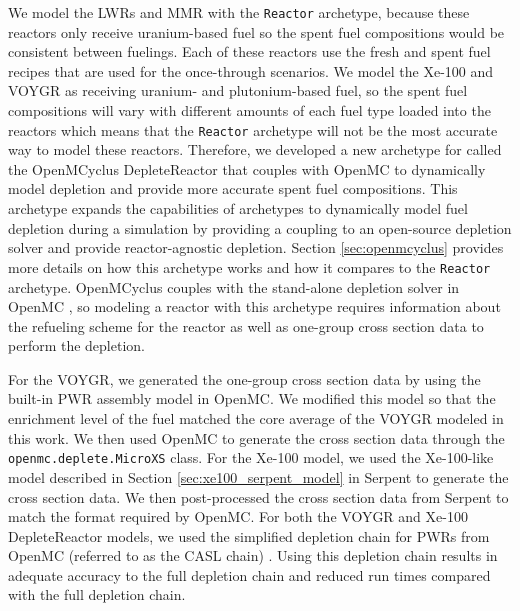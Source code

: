 

We model the \glspl{LWR} and \gls{MMR} 
with the 
\Cycamore \texttt{Reactor} archetype, because these reactors 
only receive uranium-based fuel so the spent fuel compositions 
would be consistent between fuelings. Each of these reactors use the 
fresh and spent fuel recipes that are used for the once-through scenarios.
We model the Xe-100 and VOYGR as receiving uranium- and plutonium-based 
fuel, so the spent fuel compositions will vary with different amounts 
of each fuel type loaded into the reactors which means that the 
\Cycamore \texttt{Reactor} archetype will not be the most accurate 
way to model these reactors. Therefore, we developed a new 
archetype for \Cyclus called the OpenMCyclus DepleteReactor that 
couples \Cyclus with OpenMC \cite{romano_openmc:_2015} to 
dynamically model depletion and 
provide more accurate spent fuel compositions.  
This archetype expands the capabilities of \Cyclus archetypes 
to dynamically model fuel depletion during a simulation by providing 
a coupling to an open-source depletion solver and provide
reactor-agnostic depletion. Section 
\ref{sec:openmcyclus} provides more details on how this archetype 
works and how it compares to the \Cycamore \texttt{Reactor} 
archetype. OpenMCyclus couples with the stand-alone depletion 
solver in OpenMC \cite{romano_depletion_2021}, so modeling a 
reactor with this archetype requires information about the refueling 
scheme for the reactor as well as one-group cross section data to 
perform the depletion. 

For the VOYGR, we generated the one-group cross section data by using the 
built-in \gls{PWR} assembly model in OpenMC. We modified this model so 
that the enrichment level of the fuel matched the core average of the 
VOYGR modeled in this work. We then used OpenMC to generate the cross 
section data through the \texttt{openmc.deplete.MicroXS} class.
For the Xe-100 model, we used the Xe-100-like model described in Section 
\ref{sec:xe100_serpent_model} in Serpent \cite{leppanen_serpent_2014}
to generate the cross section data. We then
post-processed the cross section data from Serpent to match the 
format required by OpenMC. For both the VOYGR and Xe-100 
DepleteReactor models, we used the simplified 
depletion chain for \glspl{PWR} from OpenMC 
(referred to as the CASL chain) 
\cite{romano_depletion_2021}. Using this depletion chain results in  
adequate accuracy to the full depletion chain \cite{romano_depletion_2021}
and reduced run times compared with the full depletion chain.  

